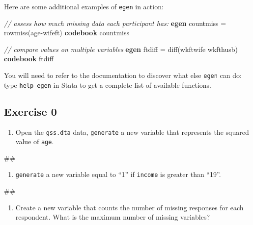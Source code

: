 \documentclass[
]{book}
\newenvironment{Shaded}{\begin{snugshade}}{\end{snugshade}}
\newcommand{\CommentTok}[1]{\textcolor[rgb]{0.56,0.35,0.01}{\textit{#1}}}
\newcommand{\FunctionTok}[1]{\textcolor[rgb]{0.00,0.00,0.00}{#1}}
\newcommand{\KeywordTok}[1]{\textcolor[rgb]{0.13,0.29,0.53}{\textbf{#1}}}
\newcommand{\NormalTok}[1]{#1}
\providecommand{\tightlist}{%
  \setlength{\itemsep}{0pt}\setlength{\parskip}{0pt}}
\begin{document}
Here are some additional examples of \texttt{egen} in action:

\begin{Shaded}
\begin{Highlighting}[]
\CommentTok{// assess how much missing data each participant has:}
\KeywordTok{egen}\NormalTok{ countmiss = }\FunctionTok{rowmiss}\NormalTok{(age{-}wifeft)}
\KeywordTok{codebook}\NormalTok{ countmiss}

\CommentTok{// compare values on multiple variables}
\KeywordTok{egen}\NormalTok{ ftdiff = }\FunctionTok{diff}\NormalTok{(wkftwife wkfthusb)}
\KeywordTok{codebook}\NormalTok{ ftdiff}
\end{Highlighting}
\end{Shaded}

You will need to refer to the documentation to discover what else \texttt{egen} can do: type \texttt{help\ egen} in Stata to get a complete list of available functions.

\hypertarget{exercise-0-6}{%
\subsection{Exercise 0}\label{exercise-0-6}}

\begin{enumerate}
\def\labelenumi{\arabic{enumi}.}
\tightlist
\item
  Open the \texttt{gss.dta} data, \texttt{generate} a new variable that represents the squared value of \texttt{age}.
\end{enumerate}

\begin{Shaded}
\begin{Highlighting}[]
\NormalTok{\#\#}
\end{Highlighting}
\end{Shaded}

\begin{enumerate}
\def\labelenumi{\arabic{enumi}.}
\setcounter{enumi}{1}
\tightlist
\item
  \texttt{generate} a new variable equal to ``1'' if \texttt{income} is greater than ``19''.
\end{enumerate}

\begin{Shaded}
\begin{Highlighting}[]
\NormalTok{\#\#}
\end{Highlighting}
\end{Shaded}

\begin{enumerate}
\def\labelenumi{\arabic{enumi}.}
\setcounter{enumi}{2}
\tightlist
\item
  Create a new variable that counts the number of missing responses for each respondent. What is the maximum number of missing variables?
\end{enumerate}
\end{document}
